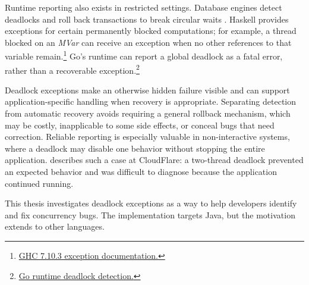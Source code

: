 Runtime reporting also exists in restricted settings. Database engines detect deadlocks and roll back transactions to break circular waits \citep{grechanik}.
Haskell provides exceptions for certain permanently blocked computations; for example, a thread blocked on an \emph{MVar} can receive an exception when no other references to that variable remain.\footnote{\href{https://downloads.haskell.org/~ghc/7.10.3/docs/html/libraries/base-4.8.2.0/Control-Exception.html}{GHC 7.10.3 exception documentation.}}
Go's runtime can report a global deadlock as a fatal error, rather than a recoverable exception.\footnote{\href{https://go.dev/src/runtime/proc.go}{Go runtime deadlock detection.}}

Deadlock exceptions make an otherwise hidden failure visible and can support application-specific handling when recovery is appropriate.
Separating detection from automatic recovery avoids requiring a general rollback mechanism, which may be costly, inapplicable to some side effects, or conceal bugs that need correction.
Reliable reporting is especially valuable in non-interactive systems, where a deadlock may disable one behavior without stopping the entire application.
\citet{ian} describes such a case at CloudFlare: a two-thread deadlock prevented an expected behavior and was difficult to diagnose because the application continued running.

This thesis investigates deadlock exceptions as a way to help developers identify and fix concurrency bugs.
The implementation targets Java, but the motivation extends to other languages.
